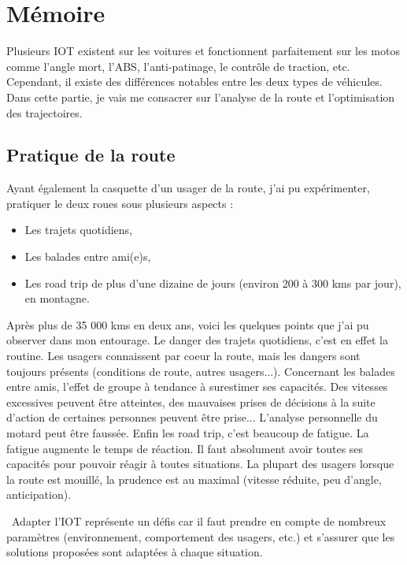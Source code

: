 \section{Mémoire}

Plusieurs IOT existent sur les voitures et fonctionnent parfaitement sur les motos comme l'angle mort, l'ABS, l'anti-patinage, le contrôle de traction, etc. Cependant, il existe des différences notables entre les deux types de véhicules. Dans cette partie, je vais me consacrer sur l'analyse de la route et l'optimisation des trajectoires.


\subsection{Pratique de la route}
Ayant également la casquette d'un usager de la route, j'ai pu expérimenter, pratiquer le deux roues sous plusieurs aspects : \
\begin{itemize}
    \item Les trajets quotidiens,
    \item Les balades entre ami(e)s,
    \item Les road trip de plus d'une dizaine de jours (environ 200 à 300 kms par jour), en montagne.
\end{itemize}

Après plus de 35 000 kms en deux ans, voici les quelques points que j'ai pu observer dans mon entourage.
Le danger des trajets quotidiens, c'est en effet la routine. Les usagers connaissent par coeur la route, mais les dangers sont toujours présents (conditions de route, autres usagers...).
Concernant les balades entre amis, l'effet de groupe à tendance à surestimer ses capacités. Des vitesses excessives peuvent être atteintes, des mauvaises prises de décisions à la suite d'action de certaines personnes peuvent être prise... L'analyse personnelle du motard peut être faussée.
Enfin les road trip, c'est beaucoup de fatigue. La fatigue augmente le temps de réaction. Il faut absolument avoir toutes ses capacités pour pouvoir réagir à toutes situations.
La plupart des usagers lorsque la route est mouillé, la prudence est au maximal (vitesse réduite, peu d'angle, anticipation).

\
Adapter l'IOT représente un défis car il faut prendre en compte de nombreux paramètres (environnement, comportement des usagers, etc.) et s'assurer que les solutions proposées sont adaptées à chaque situation.